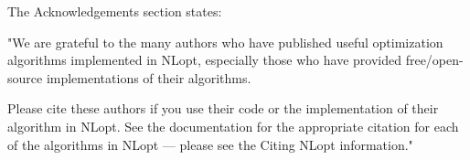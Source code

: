 \vpara
The Acknowledgements section states:

\vpara
"We are grateful to the many authors who have published useful optimization algorithms implemented in NLopt, especially those who have provided free/open-source implementations of their algorithms. 

\vpara
Please cite these authors if you use their code or the implementation of their algorithm in NLopt. See the documentation for the appropriate citation for each of the algorithms in NLopt — please see the Citing NLopt information."








%
%
%
%
%
%
%
%
%
%
%
%
%
%
